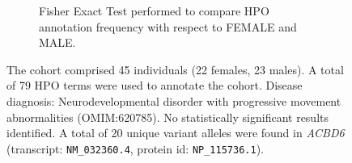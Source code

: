 \begin{figure}[htbp]
\vspace{2em}

\begin{subfigure}[b]{0.95\textwidth}
\centering
{}
\captionsetup{justification=raggedright,singlelinecheck=false}
\caption{Fisher Exact Test performed to compare HPO annotation frequency with respect to FEMALE and MALE.}
\end{subfigure}

\vspace{2em}

\caption{The cohort comprised 45 individuals (22 females, 23 males). A total of 79 HPO terms were used to annotate the cohort. Disease diagnosis: Neurodevelopmental disorder with progressive movement abnormalities (OMIM:620785). No statistically significant results identified. A total of 20 unique variant alleles were found in \textit{ACBD6} (transcript: \texttt{NM\_032360.4}, protein id: \texttt{NP\_115736.1}).}
\end{figure}
